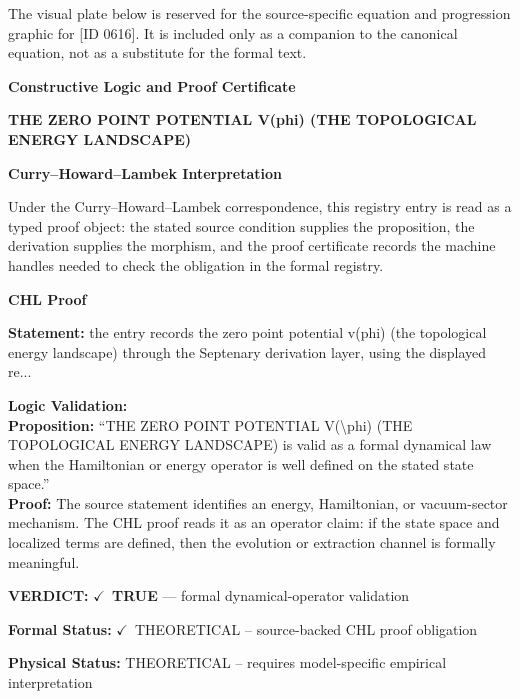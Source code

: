 \begingroup\footnotesize\sloppy
The visual plate below is reserved for the source-specific equation and progression graphic for [ID 0616]. It is included only as a companion to the canonical equation, not as a substitute for the formal text.
\par\endgroup
\ifTZPDarkEdition
{}
\fi

\clearpage
\begingroup\tzpsupportsetup
\noindent\textbf{\fontsize{10.8pt}{12.8pt}\selectfont [ID 0616] Constructive Logic and Proof Certificate}\par
\noindent\textbf{\fontsize{10pt}{12pt}\selectfont THE ZERO POINT POTENTIAL V(phi) (THE TOPOLOGICAL ENERGY LANDSCAPE)}\par
\vspace{0.45em}
\begingroup
\footnotesize
\setlength{\parskip}{0.22em}
\setlength{\parindent}{0pt}
\noindent\textbf{Curry--Howard--Lambek Interpretation}\par
Under the Curry--Howard--Lambek correspondence, this registry entry is read as a typed proof
object: the stated source condition supplies the proposition, the derivation supplies the
morphism, and the proof certificate records the machine handles needed to check the obligation
in the formal registry.

\vspace{0.45em}
\noindent\textbf{CHL Proof}\par
\textbf{Statement:} the entry records the zero point potential v(phi) (the topological energy landscape)
through the Septenary derivation layer, using the displayed re...

\textbf{Logic Validation:}\\
\textbf{Proposition:} ``THE ZERO POINT POTENTIAL V(\textbackslash{}phi) (THE TOPOLOGICAL ENERGY LANDSCAPE) is valid as a
formal dynamical law when the Hamiltonian or energy operator is well defined on the
stated state space.''\\
\textbf{Proof:} The source statement identifies an energy, Hamiltonian, or vacuum-sector mechanism. The
CHL proof reads it as an operator claim: if the state space and localized terms are
defined, then the evolution or extraction channel is formally meaningful.

\textbf{VERDICT:} \ensuremath{\checkmark}\ \textbf{TRUE} --- formal dynamical-operator validation

\textbf{Formal Status:} \ensuremath{\checkmark}\ THEORETICAL -- source-backed CHL proof obligation

\textbf{Physical Status:} THEORETICAL -- requires model-specific empirical interpretation
\par\vspace{0.45em}
\par
\ifTZPDarkEdition
{}
\fi
\endgroup
\endgroup
